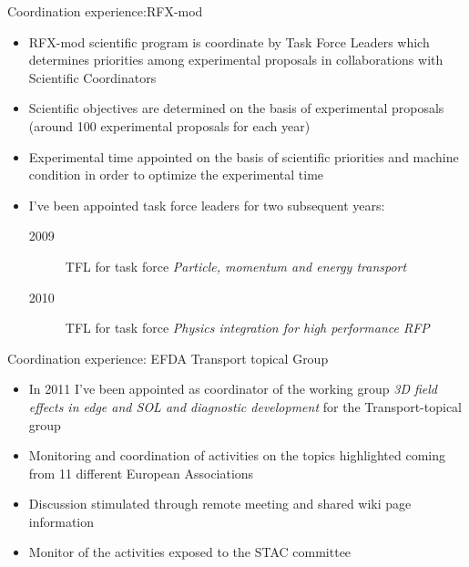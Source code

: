 \documentclass[t,10pt]{beamer}
\begin{document}
\begin{frame}{Coordination experience:RFX-mod}
\begin{itemize}[<+->]
\item RFX-mod scientific program is coordinate by Task Force Leaders which determines
  priorities among experimental proposals in collaborations with
  Scientific Coordinators
\item Scientific objectives are determined on the basis of
  experimental proposals (around 100 experimental proposals for each year)
\item Experimental time appointed on the basis of scientific
  priorities and machine condition in order to optimize the
  experimental time
\item I've been appointed task force leaders for two subsequent years:
  \begin{description}
  \item[2009] TFL for task force \emph{Particle, momentum and energy transport}
  \item[2010] TFL for task force \emph{Physics integration for high
      performance RFP}
  \end{description}
\end{itemize} 
\end{frame}


\begin{frame}{Coordination experience: EFDA Transport topical Group}
  \begin{itemize}[<+->]
\item In 2011 I've been appointed as coordinator of the working group
  \emph{3D field effects in edge and SOL and diagnostic development}
  for the Transport-topical group
\item Monitoring and coordination of activities on the topics
  highlighted coming from 11 different European Associations
\item Discussion stimulated through remote meeting and shared wiki
  page information
\item Monitor of the activities exposed to the STAC committee 
 
\end{itemize} 
\end{frame}
\end{document}
